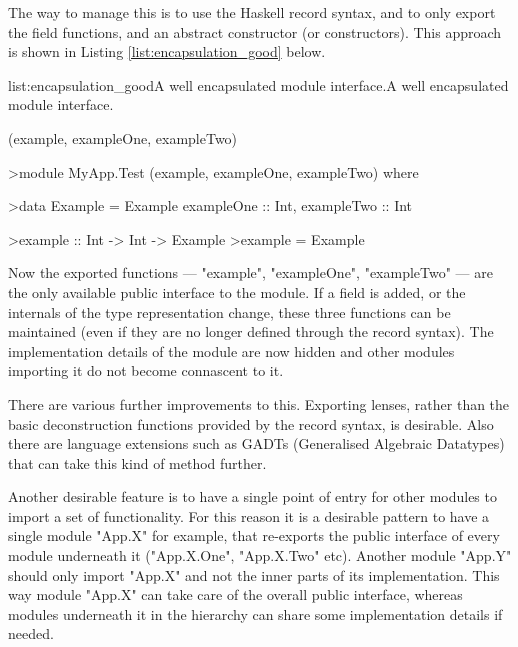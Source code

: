 The way to manage this is to use the Haskell record syntax, and to only export the field functions, and an abstract constructor (or constructors). This approach is shown in Listing \ref{list:encapsulation_good} below.

\vspace{-0.5em}
\begin{listing}{list:encapsulation_good}{A well encapsulated module interface.}{A well encapsulated module interface.}{}
\end{listing}\vspace{-1.5em}

\functions(example, exampleOne, exampleTwo)
\begin{haskell}
>module MyApp.Test (example, exampleOne, exampleTwo) where

>data Example = Example { exampleOne :: Int, exampleTwo :: Int }

>example :: Int -> Int -> Example
>example = Example

\end{haskell}
\noindent
Now the exported functions --- "example", "exampleOne", "exampleTwo" --- are the only available public interface to the module. If a field is added, or the internals of the type representation change, these three functions can be maintained (even if they are no longer defined through the record syntax). The implementation details of the module are now hidden and other modules importing it do not become connascent to it.

There are various further improvements to this. Exporting lenses, rather than the basic deconstruction functions provided by the record syntax, is desirable. Also there are language extensions such as GADTs (Generalised Algebraic Datatypes) that can take this kind of method further.

Another desirable feature is to have a single point of entry for other modules to import a set of functionality. For this reason it is a desirable pattern to have a single module "App.X" for example, that re-exports the public interface of every module underneath it ("App.X.One", "App.X.Two" etc). Another module "App.Y" should only import "App.X" and not the inner parts of its implementation. This way module "App.X" can take care of the overall public interface, whereas modules underneath it in the hierarchy can share some implementation details if needed.

